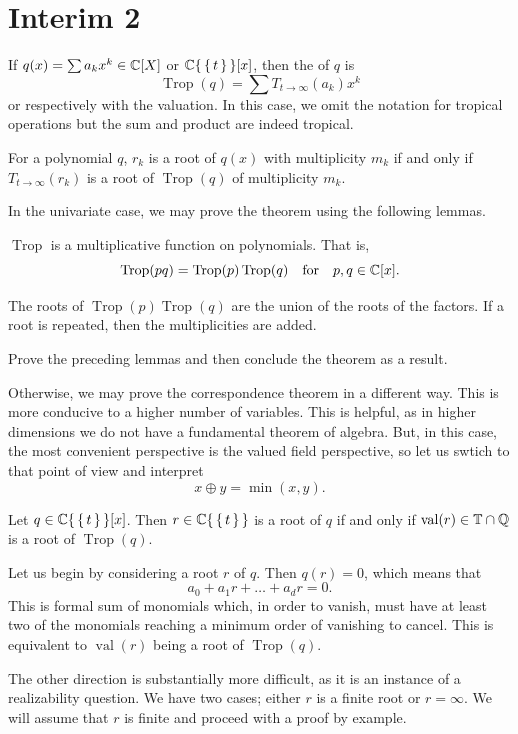 \documentclass[12pt]{memoir}
\DeclareMathOperator{\val}{val}
\DeclareMathOperator{\Trop}{Trop}
\theoremstyle{definition}
\begin{document}
\section{Interim 2}

\begin{Def}
    If $q(x)=\sum a_kx^k\in\mathbb{C}[X]$ or $\mathbb{C}\{\,\{\,t\,\}\,\}[x]$, then the  of $q$ is 
    $$\Trop(q)=\sum T_{t\to\infty}(a_k)x^k$$
    or respectively with the valuation. In this case, we omit the notation for tropical operations but the sum and product are indeed tropical.
\end{Def}

\begin{Th}
For a polynomial $q$, $r_k$ is a root of $q(x)$ with multiplicity $m_k$ if and only if $T_{t\to\infty}(r_k)$ is a root of $\Trop(q)$ of multiplicity $m_k$.
\end{Th}

In the univariate case, we may prove the theorem using the following lemmas.

\begin{Lem}
$\Trop$ is a multiplicative function on polynomials. That is,
$$\Trop(pq)=\Trop(p)\Trop(q)\word{for}p,q\in\bC[x].$$
\end{Lem}

\begin{Lem}
The roots of $\Trop(p)\Trop(q)$ are the union of the roots of the factors. If a root is repeated, then the multiplicities are added.
\end{Lem}

\begin{Ej}
Prove the preceding lemmas and then conclude the theorem as a result.
\end{Ej}

Otherwise, we may prove the correspondence theorem in a different way. This is more conducive to a higher number of variables. This is helpful, as in higher dimensions we do not have a fundamental theorem of algebra. But, in this case, the most convenient perspective is the valued field perspective, so let us swtich to that point of view and interpret 
$$x\oplus y=\min(x,y).$$

\begin{Th}
Let $q\in\mathbb{C}\{\,\{\,t\,\}\,\}[x]$. Then $r\in\mathbb{C}\{\,\{\,t\,\}\,\}$ is a root of $q$ if and only if $\val(r)\in\bT\cap\bQ$ is a root of $\Trop(q)$.
\end{Th}

\begin{ptcbp}
Let us begin by considering a root $r$ of $q$. Then $q(r)=0$, which means that 
$$a_0+a_1r+\dots+a_dr=0.$$
This is formal sum of monomials which, in order to vanish, must have at least two of the monomials reaching a minimum order of vanishing to cancel. This is equivalent to $\val(r)$ being a root of $\Trop(q)$. \par %
The other direction is substantially more difficult, as it is an instance of a realizability question. We have two cases; either $r$ is a finite root or $r=\infty$. We will assume that $r$ is finite and proceed with a proof by example. 
\end{ptcbp}
\end{document}
